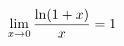 \documentclass[preview]{standalone}
\begin{document}
\begin{align*}
\special{dvisvgm:raw <g id='unique000'>}\lim_{x\to 0}\dfrac{\ln(1+x)}{x}=1\special{dvisvgm:raw </g>}
\end{align*}
\end{document}
